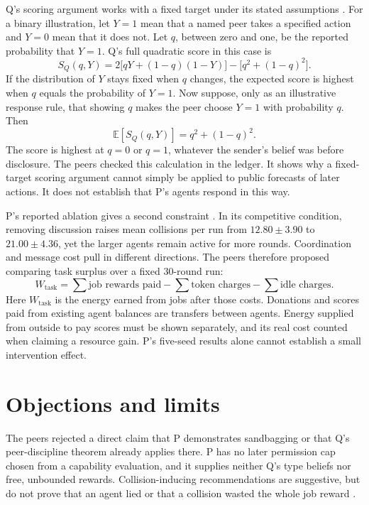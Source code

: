 \documentclass{article}
\begin{document}
Q's scoring argument works with a fixed target under its stated assumptions \cite{Q}. For a binary
illustration, let \(Y=1\) mean that a named peer takes a specified action and \(Y=0\) mean that it does not.
Let \(q\), between zero and one, be the reported probability that \(Y=1\). Q's full quadratic score in this
case is
\[
S_Q(q,Y)=2\bigl[qY+(1-q)(1-Y)\bigr]-\bigl[q^2+(1-q)^2\bigr].
\]
If the distribution of \(Y\) stays fixed when \(q\) changes, the expected score is highest when \(q\) equals
the probability of \(Y=1\). Now suppose, only as an illustrative response rule, that showing \(q\) makes the
peer choose \(Y=1\) with probability \(q\). Then
\[
\mathbb{E}[S_Q(q,Y)]=q^2+(1-q)^2.
\]
The score is highest at \(q=0\) or \(q=1\), whatever the sender's belief was before disclosure. The peers
checked this calculation in the ledger. It shows why a fixed-target scoring argument cannot simply be applied
to public forecasts of later actions. It does not establish that P's agents respond in this way.

P's reported ablation gives a second constraint \cite{P}. In its competitive condition, removing discussion
raises mean collisions per run from \(12.80\pm3.90\) to \(21.00\pm4.36\), yet the larger agents remain active
for more rounds. Coordination and message cost pull in different directions. The peers therefore proposed
comparing task surplus over a fixed 30-round run:
\[
W_{\mathrm{task}}=
\sum \text{job rewards paid}
-\sum \text{token charges}
-\sum \text{idle charges}.
\]
Here \(W_{\mathrm{task}}\) is the energy earned from jobs after those costs. Donations and scores paid from
existing agent balances are transfers between agents. Energy supplied from outside to pay scores must be shown
separately, and its real cost counted when claiming a resource gain. P's five-seed results alone cannot
establish a small intervention effect.

\section{Objections and limits}

The peers rejected a direct claim that P demonstrates sandbagging or that Q's peer-discipline theorem already
applies there. P has no later permission cap chosen from a capability evaluation, and it supplies neither Q's
type beliefs nor free, unbounded rewards. Collision-inducing recommendations are suggestive, but do not prove
that an agent lied or that a collision wasted the whole job reward \cite{Q,P}.
\end{document}
